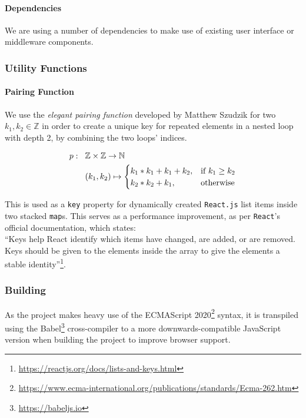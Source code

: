 \paragraph{Dependencies}
We are using a number of dependencies to make use of existing user interface or middleware components.

\subsubsection{Utility Functions}
\paragraph{Pairing Function}
We use the \textit{elegant pairing function} developed by Matthew Szudzik \cite{szudzik2006elegant} for two $k_1,k_2 \in \mathbb{Z}$ in order to create a unique key for repeated elements in a nested loop with depth 2, by combining the two loops' indices.

\begin{equation}
    \begin{aligned}
        p: \hspace{0.3cm} & \mathbb{Z} \times \mathbb{Z} \rightarrow \mathbb{N}\\
        & (k_1,k_2) \mapsto
        \begin{cases}
        k_1 * k_1 + k_1 + k_2, & \text{if}\ k_1 \geq k_2 \\
        k_2 * k_2 + k_1, & \text{otherwise}
        \end{cases}
    \end{aligned}
\end{equation}

This is used as a \texttt{key} property for dynamically created \texttt{React.js} list items inside two stacked \texttt{map}s. This serves as a performance improvement, as per \texttt{React}'s official documentation, which states:\\
``Keys help React identify which items have changed, are added, or are removed. Keys should be given to the elements inside the array to give the elements a stable identity''\footnote{\url{https://reactjs.org/docs/lists-and-keys.html}}.

\subsubsection{Building}
As the project makes heavy use of the ECMAScript 2020\footnote{\url{https://www.ecma-international.org/publications/standards/Ecma-262.htm}} syntax, it is transpiled using the Babel\footnote{\url{https://babeljs.io}} cross-compiler to a more downwards-compatible JavaScript version when building the project to improve browser support.

